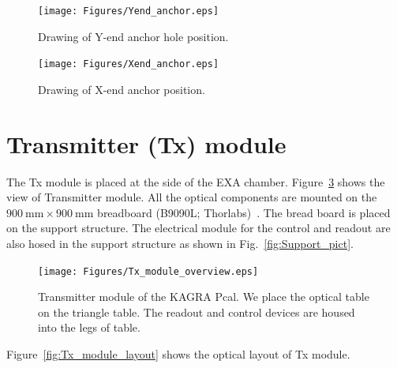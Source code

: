 \begin{figure}
\begin{center}
\texttt{[image: Figures/Yend\_anchor.eps]}
\caption{Drawing of Y-end anchor hole position.} 
\label{fig:Yend_anchor} 
\end{center}
\end{figure}

\begin{figure}
\begin{center}
\texttt{[image: Figures/Xend\_anchor.eps]}
\caption{Drawing of X-end anchor position.} 
\label{fig:Xend_anchor} 
\end{center}
\end{figure}


\section{Transmitter (Tx) module}
The Tx module is placed at the side of the EXA chamber. Figure~\ref{fig:Tx_module_overview} shows the view of Transmitter module. All the optical components are mounted on the $900~\mathrm{mm}\times  900~\mathrm{mm}$ breadboard (B9090L; Thorlabs)~\cite{Thorlabs}. The bread board is placed on the support structure. The electrical module for the control and readout are also hosed in the support structure as shown in Fig.~\ref{fig:Support_pict}. 

\begin{figure}
\begin{center}
\texttt{[image: Figures/Tx\_module\_overview.eps]}
\caption{Transmitter module of the KAGRA Pcal. We place the optical table on the triangle table. The readout and control devices are housed into the legs of table.} 
\label{fig:Tx_module_overview} 
\end{center}
\end{figure}



Figure~\ref{fig:Tx_module_layout} shows the optical layout of Tx module.


